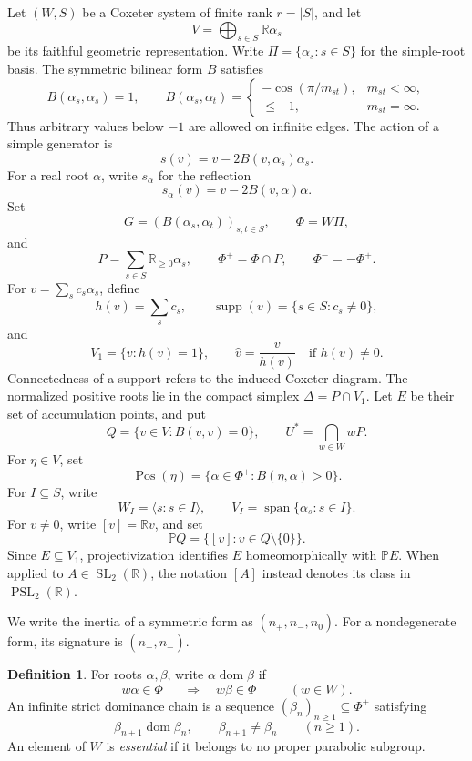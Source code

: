 \documentclass[11pt,reqno]{amsart}
\newcommand{\R}{\mathbb{R}}
\theoremstyle{plain}
\theoremstyle{definition}
\newtheorem{definition}[theorem]{Definition}
\theoremstyle{remark}
\numberwithin{equation}{section}
\DeclareMathOperator{\supp}{supp}
\DeclareMathOperator{\Pos}{Pos}
\DeclareMathOperator{\dom}{dom}
\begin{document}
Let $(W,S)$ be a Coxeter system of finite rank $r=|S|$, and let
\[
V=\bigoplus_{s\in S}\R\alpha_s
\]
be its faithful geometric representation. Write $\Pi=\{\alpha_s:s\in S\}$ for the simple-root basis. The symmetric bilinear form $B$ satisfies
\[
B(\alpha_s,\alpha_s)=1,\qquad
B(\alpha_s,\alpha_t)=
\begin{cases}
-\cos(\pi/m_{st}),&m_{st}<\infty,\\
\leq-1,&m_{st}=\infty.
\end{cases}
\]
Thus arbitrary values below $-1$ are allowed on infinite edges. The action of a simple generator is
\[
s(v)=v-2B(v,\alpha_s)\alpha_s.
\]
For a real root $\alpha$, write $s_\alpha$ for the reflection
\[
s_\alpha(v)=v-2B(v,\alpha)\alpha.
\]
Set
\[
G=(B(\alpha_s,\alpha_t))_{s,t\in S},\qquad \Phi=W\Pi,
\]
and
\[
P=\sum_{s\in S}\R_{\geq0}\alpha_s,\qquad
\Phi^+=\Phi\cap P,\qquad\Phi^-=-\Phi^+.
\]
For $v=\sum_s c_s\alpha_s$, define
\[
h(v)=\sum_s c_s,\qquad\supp(v)=\{s\in S:c_s\neq0\},
\]
and
\[
V_1=\{v:h(v)=1\},\qquad
\widehat v=\frac{v}{h(v)}\quad\text{if }h(v)\neq0.
\]
Connectedness of a support refers to the induced Coxeter diagram. The normalized positive roots lie in the compact simplex $\Delta=P\cap V_1$. Let $E$ be their set of accumulation points, and put
\[
Q=\{v\in V:B(v,v)=0\},\qquad U^*=\bigcap_{w\in W}wP.
\]
For $\eta\in V$, set
\[
\Pos(\eta)=\{\alpha\in\Phi^+:B(\eta,\alpha)>0\}.
\]
For $I\subseteq S$, write
\[
W_I=\langle s:s\in I\rangle,\qquad
V_I=\operatorname{span}\{\alpha_s:s\in I\}.
\]
For $v\neq0$, write $[v]=\R v$, and set
\[
\mathbb P Q=\{[v]:v\in Q\setminus\{0\}\}.
\]
Since $E\subseteq V_1$, projectivization identifies $E$ homeomorphically with $\mathbb P E$. When applied to $A\in\operatorname{SL}_2(\R)$, the notation $[A]$ instead denotes its class in $\operatorname{PSL}_2(\R)$.

We write the inertia of a symmetric form as $(n_+,n_-,n_0)$. For a nondegenerate form, its signature is $(n_+,n_-)$.

\begin{definition}
For roots $\alpha,\beta$, write $\alpha\dom\beta$ if
\[
w\alpha\in\Phi^-\quad\Longrightarrow\quad w\beta\in\Phi^-
\qquad(w\in W).
\]
An infinite strict dominance chain is a sequence $(\beta_n)_{n\geq1}\subseteq\Phi^+$ satisfying
\[
\beta_{n+1}\dom\beta_n,\qquad\beta_{n+1}\neq\beta_n\qquad(n\geq1).
\]
An element of $W$ is \emph{essential} if it belongs to no proper parabolic subgroup.
\end{definition}
\end{document}
